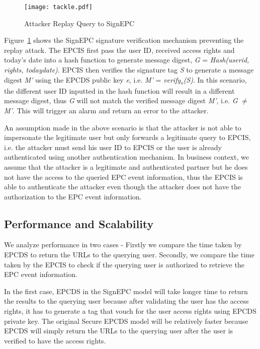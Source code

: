 \documentclass[conference]{IEEEtran}
\begin{document}
\begin{figure}[h]
\begin{center}
\texttt{[image: tackle.pdf]}
\caption{Attacker Replay Query to SignEPC \label{fig:tackle}}
\end{center}
\end{figure}

Figure~\ref{fig:tackle} shows the SignEPC signature verification mechanism preventing the replay attack. The EPCIS first pass the user ID, received access rights and today's date into a hash function to generate message digest, \emph{G} = \emph{Hash(userid, rights, todaydate)}. EPCIS then verifies the signature tag \emph{S} to generate a message digest \emph{M'} using the EPCDS public key \emph{e}, i.e. \emph{M'} = \emph{verify\textsubscript{e}(S)}.  In this scenario, the different user ID inputted in the hash function will result in a different message digest, thus \emph{G} will not match the verified message digest \emph{M'}, i.e. \emph{G} $\neq$ \emph{M'}. This will trigger an alarm and return an error to the attacker.

An assumption made in the above scenario is that the attacker is not able to impersonate the legitimate user but only forwards a legitimate query to EPCIS, i.e. the attacker must send his user ID to EPCIS or the user is already authenticated using another authentication mechanism. In business context, we assume that the attacker is a legitimate and authenticated partner but he does not have the access to the queried EPC event information, thus the EPCIS is able to authenticate the attacker even though the attacker does not have the authorization to the EPC event information. 

\subsection {Performance and Scalability}
We analyze performance in two cases - Firstly we compare the time taken by EPCDS to return the URLs to the querying user. Secondly, we compare the time taken by the EPCIS to check if the querying user is authorized to retrieve the EPC event information. 

In the first case, EPCDS in the SignEPC model will take longer time to return the results to the querying user because after validating the user has the access rights, it has to generate a tag that vouch for the user access rights using EPCDS private key. The original Secure EPCDS model will be relatively faster because EPCDS will simply return the URLs to the querying user after the user is verified to have the access rights.
\end{document}
